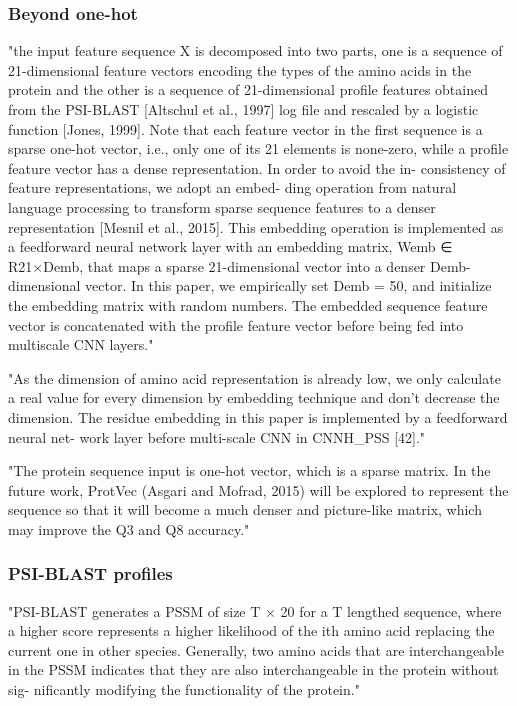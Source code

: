   \subsubsection{Beyond one-hot}
  "the input feature sequence X is decomposed into two parts, one is a sequence of 21-dimensional feature vectors encoding the types of the amino acids in the protein and the other is a sequence of 21-dimensional profile features obtained from the PSI-BLAST [Altschul et al., 1997] log file and rescaled by a logistic function [Jones, 1999]. Note that each feature vector in the first sequence is a sparse one-hot vector, i.e., only one of its 21 elements is none-zero, while a profile feature vector has a dense representation. In order to avoid the in- consistency of feature representations, we adopt an embed- ding operation from natural language processing to transform sparse sequence features to a denser representation [Mesnil et al., 2015]. This embedding operation is implemented as a feedforward neural network layer with an embedding matrix, Wemb ∈ R21×Demb, that maps a sparse 21-dimensional vector into a denser Demb-dimensional vector. In this paper, we empirically set Demb = 50, and initialize the embedding matrix with random numbers. The embedded sequence feature vector is concatenated with the profile feature vector before being fed into multiscale CNN layers." \cite{Li2016}

  "As the dimension of amino acid representation is already low, we only calculate a real value for every dimension by embedding technique and don’t decrease the dimension. The residue embedding in this paper is implemented by a feedforward neural net- work layer before multi-scale CNN in CNNH\_PSS [42]." \cite{Zhou2018}

  "The protein sequence input is one-hot vector, which is a sparse matrix. In the future work, ProtVec (Asgari and Mofrad, 2015) will be explored to represent the sequence so that it will become a much denser and picture-like matrix, which may improve the Q3 and Q8 accuracy." \cite{Fang2017}

	\subsubsection{PSI-BLAST profiles}
	"PSI-BLAST generates a PSSM of size T × 20 for a T lengthed sequence, where a higher score represents a higher likelihood of the ith amino acid replacing the current one in other species. Generally, two amino acids that are interchangeable in the PSSM indicates that they are also interchangeable in the protein without sig- nificantly modifying the functionality of the protein." \cite{Lin2016}

